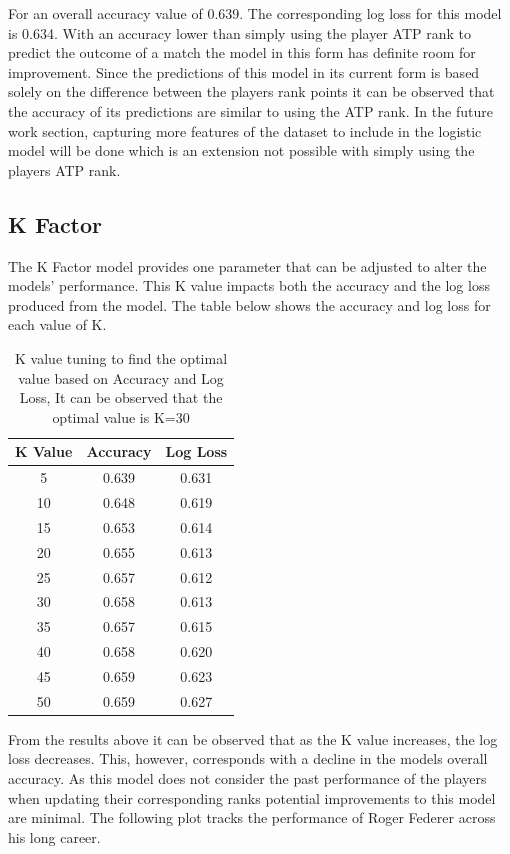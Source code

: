 \documentclass[12pt,a4paper]{article}
\begin{document}
For an overall accuracy value of 0.639. The corresponding log loss for this model is 0.634.
With an accuracy lower than simply using the player ATP rank to predict the outcome of a
match the model in this form has definite room for improvement. Since the predictions of
this model in its current form is based solely on the difference between the players rank
points it can be observed that the accuracy of its predictions are similar to using the ATP
rank. In the future work section, capturing more features of the dataset to include in the
logistic model will be done which is an extension not possible with simply using the players
ATP rank.
\subsection{K Factor}
The K Factor model provides one parameter that can be adjusted to alter the models' performance.
This K value impacts both the accuracy and the log loss produced from the model. The table
below shows the accuracy and log loss for each value of K.

\begin{table}[h]
  \centering
  \begin{tabular}{||c c c||}
    \hline
    K Value & Accuracy & Log Loss \\
    \hline\hline
    5       & 0.639    & 0.631    \\
    10      & 0.648    & 0.619    \\
    15      & 0.653    & 0.614    \\
    20      & 0.655    & 0.613    \\
    25      & 0.657    & 0.612    \\
    30      & 0.658    & 0.613    \\
    35      & 0.657    & 0.615    \\
    40      & 0.658    & 0.620    \\
    45      & 0.659    & 0.623    \\
    50      & 0.659    & 0.627    \\
    \hline
  \end{tabular}
  \caption{K value tuning to find the optimal value based on Accuracy and Log Loss, It
    can be observed that the optimal value is K=30}
\end{table}
From the results above it can be observed that as the K value increases, the log loss decreases.
This, however, corresponds with a decline in the models overall accuracy. As this model
does not consider the past performance of the players when updating their corresponding
ranks potential improvements to this model are minimal. The following plot tracks the performance
of Roger Federer across his long career.
\end{document}
